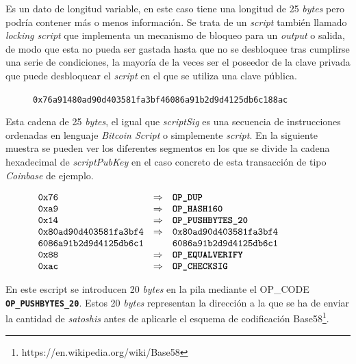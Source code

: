 \documentclass{article}
\begin{document}
    Es un dato de longitud variable, en este caso tiene una longitud de 25 \textit{bytes} pero podría contener más o menos información. Se trata de un \textit{script} también llamado \textit{locking script} que implementa un mecanismo de bloqueo para un \textit{output} o salida, de modo que esta no pueda ser gastada hasta que no se desbloquee tras cumplirse una serie de condiciones, la mayoría de la veces ser el poseedor de la clave privada que puede desbloquear el \textit{script} en el que se utiliza una clave pública.
    
    \begin{figure}[H]
        \texttt{0x76a91480ad90d403581fa3bf46086a91b2d9d4125db6c188ac}
    \end{figure}
    
    Esta cadena de 25 \textit{bytes}, el igual que \textit{scriptSig} es una secuencia de instrucciones ordenadas en lenguaje \textit{Bitcoin Script} o simplemente \textit{script}. En la siguiente muestra se pueden ver los diferentes segmentos en los que se divide la cadena hexadecimal de \textit{scriptPubKey} en el caso concreto de esta transacción de tipo \textit{Coinbase} de ejemplo.
    
    \begin{figure}[H]
        $\begin{array}{lcl}
            \texttt{0x76} & \Rightarrow & \textbf{\texttt{OP\_DUP}} \\
            \texttt{0xa9} & \Rightarrow & \textbf{\texttt{OP\_HASH160}}\\
            \texttt{0x14} & \Rightarrow & \textbf{\texttt{OP\_PUSHBYTES\_20}} \\
            \texttt{0x80ad90d403581fa3bf4} & \Rightarrow & \texttt{0x80ad90d403581fa3bf4} \\
            \texttt{6086a91b2d9d4125db6c1} & & \texttt{6086a91b2d9d4125db6c1} \\
            \texttt{0x88} & \Rightarrow & \textbf{\texttt{OP\_EQUALVERIFY}} \\
            \texttt{0xac} & \Rightarrow & \textbf{\texttt{OP\_CHECKSIG}}
        \end{array}$
    \end{figure}
    En este escript se introducen 20 \textit{bytes} en la pila mediante el OP\_CODE \textbf{\texttt{OP\_PUSHBYTES\_20}}. Estos 20 \textit{bytes} representan la dirección a la que se ha de enviar la cantidad de \textit{satoshis} antes de aplicarle el esquema de codificación Base58\footnote{https://en.wikipedia.org/wiki/Base58}.
    
\end{document}
